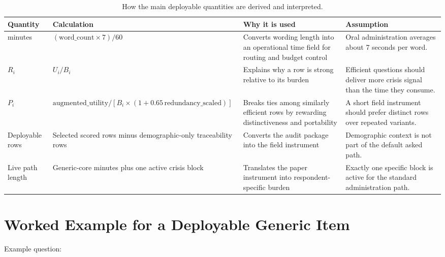 \documentclass[12pt]{article}
\begin{document}
\begin{table}[H]
\centering
\small
\begin{tabularx}{\textwidth}{L{0.18\textwidth} Y Y Y}
\toprule
Quantity & Calculation & Why it is used & Assumption \\
\midrule
minutes & $(\text{word\_count} \times 7)/60$ & Converts wording length into an operational time field for routing and budget control & Oral administration averages about 7 seconds per word. \\
$R_i$ & $U_i / B_i$ & Explains why a row is strong relative to its burden & Efficient questions should deliver more crisis signal than the time they consume. \\
$P_i$ & $\text{augmented\_utility} / [B_i \times (1 + 0.65\,\text{redundancy\_scaled})]$ & Breaks ties among similarly efficient rows by rewarding distinctiveness and portability & A short field instrument should prefer distinct rows over repeated variants. \\
Deployable rows & Selected scored rows minus demographic-only traceability rows & Converts the audit package into the field instrument & Demographic context is not part of the default asked path. \\
Live path length & Generic-core minutes plus one active crisis block & Translates the paper instrument into respondent-specific burden & Exactly one specific block is active for the standard administration path. \\
\bottomrule
\end{tabularx}
\caption{How the main deployable quantities are derived and interpreted.}
\end{table}

\section{Worked Example for a Deployable Generic Item}

Example question: 
\end{document}

